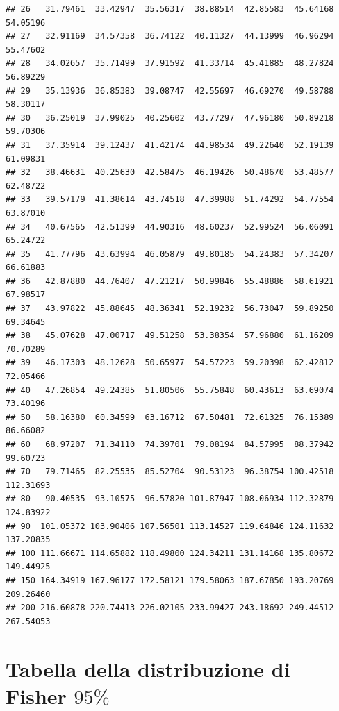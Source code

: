 \documentclass[onecolumn,12pt]{book}\usepackage[]{graphicx}\usepackage[]{color}
\makeatletter
\newenvironment{kframe}{%
 \def\at@end@of@kframe{}%
 \ifinner\ifhmode%
  \def\at@end@of@kframe{\end{minipage}}%
  \begin{minipage}{\columnwidth}%
 \fi\fi%
 \def\FrameCommand##1{\hskip\@totalleftmargin \hskip-\fboxsep
 \colorbox{shadecolor}{##1}\hskip-\fboxsep
     \hskip-\linewidth \hskip-\@totalleftmargin \hskip\columnwidth}%
 \MakeFramed {\advance\hsize-\width
   \@totalleftmargin\z@ \linewidth\hsize
   \@setminipage}}%
 {\par\unskip\endMakeFramed%
 \at@end@of@kframe}
\newenvironment{knitrout}{}{} %
\makeatother
\begin{document}
\begin{knitrout}
\begin{kframe}
\begin{verbatim}
## 26   31.79461  33.42947  35.56317  38.88514  42.85583  45.64168  54.05196
## 27   32.91169  34.57358  36.74122  40.11327  44.13999  46.96294  55.47602
## 28   34.02657  35.71499  37.91592  41.33714  45.41885  48.27824  56.89229
## 29   35.13936  36.85383  39.08747  42.55697  46.69270  49.58788  58.30117
## 30   36.25019  37.99025  40.25602  43.77297  47.96180  50.89218  59.70306
## 31   37.35914  39.12437  41.42174  44.98534  49.22640  52.19139  61.09831
## 32   38.46631  40.25630  42.58475  46.19426  50.48670  53.48577  62.48722
## 33   39.57179  41.38614  43.74518  47.39988  51.74292  54.77554  63.87010
## 34   40.67565  42.51399  44.90316  48.60237  52.99524  56.06091  65.24722
## 35   41.77796  43.63994  46.05879  49.80185  54.24383  57.34207  66.61883
## 36   42.87880  44.76407  47.21217  50.99846  55.48886  58.61921  67.98517
## 37   43.97822  45.88645  48.36341  52.19232  56.73047  59.89250  69.34645
## 38   45.07628  47.00717  49.51258  53.38354  57.96880  61.16209  70.70289
## 39   46.17303  48.12628  50.65977  54.57223  59.20398  62.42812  72.05466
## 40   47.26854  49.24385  51.80506  55.75848  60.43613  63.69074  73.40196
## 50   58.16380  60.34599  63.16712  67.50481  72.61325  76.15389  86.66082
## 60   68.97207  71.34110  74.39701  79.08194  84.57995  88.37942  99.60723
## 70   79.71465  82.25535  85.52704  90.53123  96.38754 100.42518 112.31693
## 80   90.40535  93.10575  96.57820 101.87947 108.06934 112.32879 124.83922
## 90  101.05372 103.90406 107.56501 113.14527 119.64846 124.11632 137.20835
## 100 111.66671 114.65882 118.49800 124.34211 131.14168 135.80672 149.44925
## 150 164.34919 167.96177 172.58121 179.58063 187.67850 193.20769 209.26460
## 200 216.60878 220.74413 226.02105 233.99427 243.18692 249.44512 267.54053
\end{verbatim}
\end{kframe}
\end{knitrout}
\normalsize\section*{Tabella della distribuzione di Fisher $95\%$}
\oddsidemargin 0.0in
\evensidemargin 0.0in
\topmargin -0.4in
\small
\end{document}
